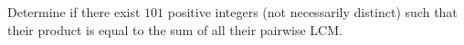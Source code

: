 Determine if there exist $101$ positive integers (not necessarily distinct) such that their product is equal to the sum of all their pairwise LCM.